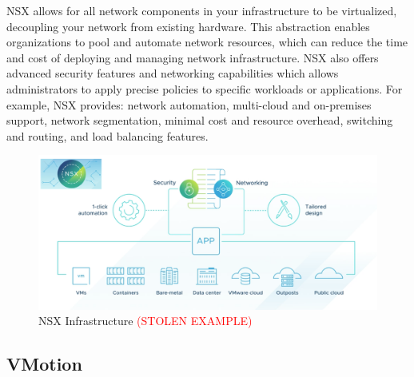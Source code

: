 NSX allows for all network components in your infrastructure to be virtualized, decoupling your network from existing hardware. This abstraction enables organizations to pool and automate network resources, which can reduce the time and cost of deploying and managing network infrastructure. NSX also offers advanced security features and networking capabilities which allows administrators to apply precise policies to specific workloads or applications. For example, NSX provides: network automation, multi-cloud and on-premises support, network segmentation, minimal cost and resource overhead, switching and routing, and load balancing features. 

\begin{figure}[H]
    \centering
    \includegraphics[scale = .19]{images/nsx-diagram.png}
    \caption{NSX Infrastructure \textcolor{red}{(STOLEN EXAMPLE)} }
    \label{NSX}
\end{figure}

\subsection{VMotion}
\textcolor{red}{\textbf{\lipsum[1-1]}}